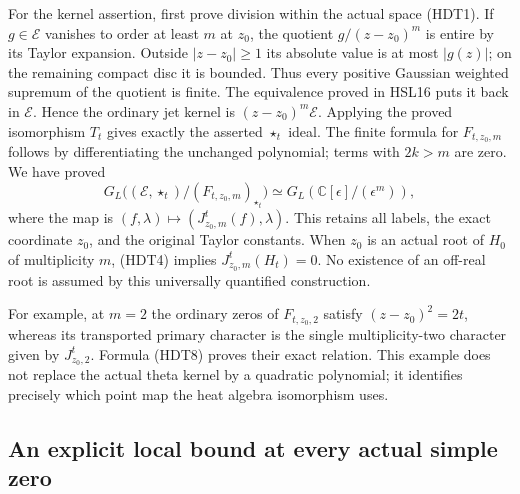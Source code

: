 For the kernel assertion, first prove division within the actual
space (HDT1). If $g\in\mathcal E$ vanishes to order at least
$m$ at $z_0$, the quotient $g/(z-z_0)^m$ is entire by its Taylor
expansion. Outside $|z-z_0|\ge1$ its absolute value is at most
$|g(z)|$; on the remaining compact disc it is bounded. Thus
every positive Gaussian weighted supremum of the quotient is
finite. The equivalence proved in HSL16 puts it back in
$\mathcal E$. Hence the ordinary jet kernel is
$(z-z_0)^m\mathcal E$. Applying the proved isomorphism $T_t$
gives exactly the asserted $\star_t$ ideal. The finite formula
for $F_{t,z_0,m}$ follows by differentiating the unchanged
polynomial; terms with $2k>m$ are zero. We have proved
\begin{equation}\tag{HDT9}
 G_L\bigl((\mathcal E,\star_t)/(F_{t,z_0,m})_{\star_t}\bigr)
       \simeq G_L(\mathbb C[\epsilon]/(\epsilon^m)),
\end{equation}
where the map is $(f,\lambda)\mapsto(J^t_{z_0,m}(f),\lambda)$.
This retains all labels, the exact coordinate $z_0$, and the
original Taylor constants. When $z_0$ is an actual root of
$H_0$ of multiplicity $m$, (HDT4) implies
$J^t_{z_0,m}(H_t)=0$. No existence of an off-real root is
assumed by this universally quantified construction.

For example, at $m=2$ the ordinary zeros of $F_{t,z_0,2}$
satisfy $(z-z_0)^2=2t$, whereas its transported primary
character is the single multiplicity-two character given by
$J^t_{z_0,2}$. Formula (HDT8) proves their exact relation.
This example does not replace the actual theta kernel by a
quadratic polynomial; it identifies precisely which point map
the heat algebra isomorphism uses.

\subsection{An explicit local bound at every actual simple zero}

